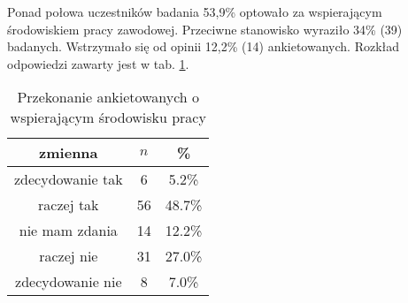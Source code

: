 
Ponad połowa uczestników badania 53,9\% optowało za wspierającym środowiskiem pracy zawodowej. Przeciwne stanowisko wyraziło 34\% (39) badanych. Wstrzymało się od opinii 12,2\% (14) ankietowanych. Rozkład odpowiedzi zawarty jest w tab. \ref{tab:Q7}.

\begin{table}[H]
\caption {Przekonanie ankietowanych o wspierającym środowisku pracy}
\centering
\begin{tabular}{ | c | c | c |}
\hline
zmienna & $n$ & \% \\
\hline
zdecydowanie tak  &  6  & 5.2\% \\
\hline
raczej tak  &  56  & 48.7\% \\
\hline
nie mam zdania  &  14  & 12.2\% \\
\hline
raczej nie  &  31  & 27.0\% \\
\hline
zdecydowanie nie  &  8  & 7.0\% \\
\hline
\end{tabular}
\label{tab:Q7}
\end{table}
